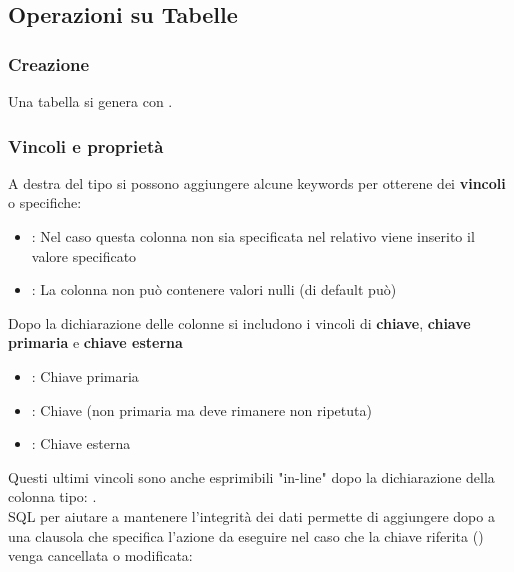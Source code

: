 \subsection{Operazioni su Tabelle}
\subsubsection{Creazione}
Una tabella si genera con .

\subsubsection{Vincoli e proprietà}
A destra del tipo si possono aggiungere alcune keywords per otterene dei \textbf{vincoli} o specifiche:
\begin{itemize}
    \item {}: Nel caso questa colonna non sia specificata nel relativo  viene inserito il valore specificato
    \item {}: La colonna non può contenere valori nulli (di default può)
\end{itemize}
Dopo la dichiarazione delle colonne si includono i vincoli di \textbf{chiave}, \textbf{chiave primaria} e \textbf{chiave esterna}
\begin{itemize}
    \item {}: Chiave primaria
    \item {}: Chiave (non primaria ma deve rimanere non ripetuta)
    \item {}: Chiave esterna
\end{itemize}
Questi ultimi vincoli sono anche esprimibili "in-line" dopo la dichiarazione della colonna tipo: .\\
SQL per aiutare a mantenere l'integrità dei dati permette di aggiungere dopo a  una clausola che specifica l'azione da eseguire nel caso che la chiave riferita () venga cancellata o modificata:

